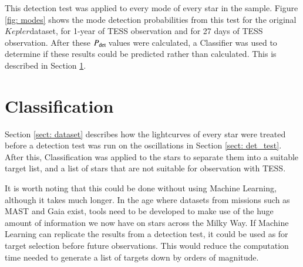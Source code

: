 \documentclass[a4paper,fleqn,usenatbib,useAMS]{mnras}
\newcommand{\kep}{\ensuremath{Kepler}\:}
\newcommand{\pdet}{\ensuremath{P_{\rm det}\:}}
\begin{document}
This detection test was applied to every mode of every star in the sample. Figure \ref{fig: modes} shows the mode detection probabilities from this test for the original \kep dataset, for 1-year of TESS observation and for 27 days of TESS observation. After these \pdet values were calculated, a Classifier was used to determine if these results could be predicted rather than calculated. This is described in Section \ref{sect: classifier}.


\section{Classification}
\label{sect: classifier}

Section \ref{sect: dataset} describes how the lightcurves of every star were treated before a detection test was run on the oscillations in Section \ref{sect: det_test}. After this, Classification was applied to the stars to separate them into a suitable target list, and a list of stars that are not suitable for observation with TESS.

It is worth noting that this could be done without using Machine Learning, although it takes much longer. In the age where datasets from missions such as MAST and Gaia \citep{gaia_collaboration_gaia_2016} exist, tools need to be developed to make use of the huge amount of information we now have on stars across the Milky Way. If Machine Learning can replicate the results from a detection test, it could be used as for target selection before future observations. This would reduce the computation time needed to generate a list of targets down by orders of magnitude.
\end{document}
